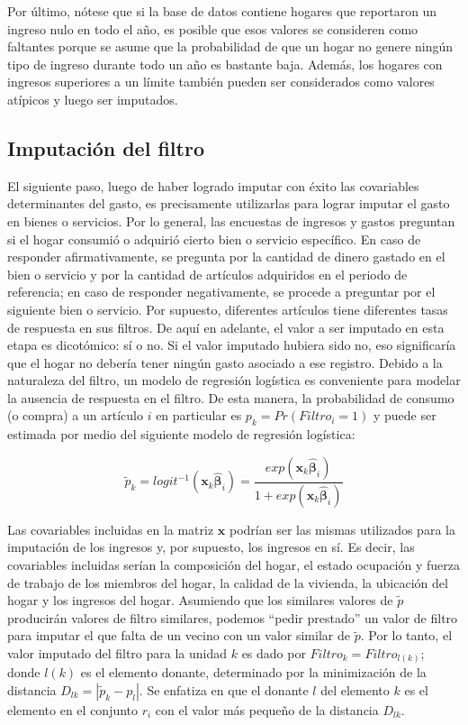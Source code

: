 \documentclass[
  12pt,
]{book}
\begin{document}
Por último, nótese que si la base de datos contiene hogares que reportaron un ingreso nulo en todo el año, es posible que esos valores se consideren como faltantes porque se asume que la probabilidad de que un hogar no genere ningún tipo de ingreso durante todo un año es bastante baja. Además, los hogares con ingresos superiores a un límite también pueden ser considerados como valores atípicos y luego ser imputados.

\hypertarget{imputaciuxf3n-del-filtro}{%
\subsection{Imputación del filtro}\label{imputaciuxf3n-del-filtro}}

El siguiente paso, luego de haber logrado imputar con éxito las covariables determinantes del gasto, es precisamente utilizarlas para lograr imputar el gasto en bienes o servicios. Por lo general, las encuestas de ingresos y gastos preguntan si el hogar consumió o adquirió cierto bien o servicio específico. En caso de responder afirmativamente, se pregunta por la cantidad de dinero gastado en el bien o servicio y por la cantidad de artículos adquiridos en el periodo de referencia; en caso de responder negativamente, se procede a preguntar por el siguiente bien o servicio. Por supuesto, diferentes artículos tiene diferentes tasas de respuesta en sus filtros. De aquí en adelante, el valor a ser imputado en esta etapa es dicotómico: sí o no. Si el valor imputado hubiera sido no, eso significaría que el hogar no debería tener ningún gasto asociado a ese registro. Debido a la naturaleza del filtro, un modelo de regresión logística es conveniente para modelar la ausencia de respuesta en el filtro. De esta manera, la probabilidad de consumo (o compra) a un artículo \(i\) en particular es \(p_k = Pr(Filtro_i = 1)\) y puede ser estimada por medio del siguiente modelo de regresión logística:

\[
\tilde{p}_k = logit^{-1}(\mathbf{x}_k \hat{\boldsymbol{\beta}}_i) =
\frac{exp(\mathbf{x}_k \hat{\boldsymbol{\beta}}_i)}{1+exp(\mathbf{x}_k \hat{\boldsymbol{\beta}}_i)}
\]

Las covariables incluidas en la matriz \(\mathbf{x}\) podrían ser las mismas utilizados para la imputación de los ingresos y, por supuesto, los ingresos en sí. Es decir, las covariables incluidas serían la composición del hogar, el estado ocupación y fuerza de trabajo de los miembros del hogar, la calidad de la vivienda, la ubicación del hogar y los ingresos del hogar. Asumiendo que los similares valores de \(\tilde p\) producirán valores de filtro similares, podemos ``pedir prestado'' un valor de filtro para imputar el que falta de un vecino con un valor similar de \(\tilde p\). Por lo tanto, el valor imputado del filtro para la unidad \(k\) es dado por \(Filtro_k = Filtro_{l(k)}\); donde \(l(k)\) es el elemento donante, determinado por la minimización de la distancia \(D_{lk} = |\tilde p_k - p_l|\). Se enfatiza en que el donante \(l\) del elemento \(k\) es el elemento en el conjunto \(r_i\) con el valor más pequeño de la distancia \(D_{lk}\).
\end{document}
